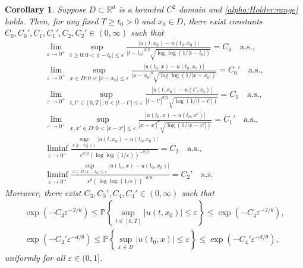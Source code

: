 \documentclass[reqno]{amsart}
\newcommand{\R}{\mathbb R}
\renewcommand{\P}{\mathbb P}
\newcommand{\1}{\mathbf 1}
\numberwithin{equation}{section}
\newtheorem{corollary}[theorem]{Corollary}
\theoremstyle{definition}
\begin{document}
\begin{corollary}
Suppose $D\subset \R^d$ is a bounded $C^2$ domain and \eqref{alpha:Holder:range} holds.
Then, for any fixed $T \ge t_0>0$ and $x_0 \in D$, there exist constants $C_0,C_0',C_1,C_1',C_2,C_2' \in (0,\infty)$ such that
\begin{gather*}
	\lim_{\varepsilon\to0^+} \sup_{t \ge 0:0< |t-t_0| \le \varepsilon} \frac{|u(t,x_0)-u(t_0,x_0)|}{|t-t_0|^{\theta/2} \sqrt{\log\log(1/|t-t_0|)}} = C_0 \quad \text{a.s.},\\
	\lim_{\varepsilon\to0^+} \sup_{x \in D: 0< |x-x_0| \le \varepsilon} \frac{|u(t_0,x)-u(t_0,x_0)|}{|x-x_0|^\theta \sqrt{\log\log(1/|x-x_0|)}} = C_0' \quad \text{a.s.},\\
	\lim_{\varepsilon\to0^+} \sup_{t,t' \in [0,T]: 0<|t-t'| \le \varepsilon} \frac{|u(t,x_0)-u(t',x_0)|}{|t-t'|^{\theta/2} \sqrt{\log(1/|t-t'|)}} = C_1 \quad \text{a.s.},\\
	\lim_{\varepsilon\to0^+} \sup_{x,x'\in D: 0<|x-x'| \le \varepsilon} \frac{|u(t_0,x)-u(t_0,x')|}{|x-x'|^\theta \sqrt{\log(1/|x-x'|)}} = C_1' \quad \text{a.s.},\\
	\liminf_{\varepsilon\to0^+} \frac{\sup_{t: |t-t_0| \le \varepsilon}|u(t,x_0)-u(t_0,x_0)|}{\varepsilon^{\theta/2} (\log\log(1/\varepsilon))^{-\theta/2}} = C_2 \quad \text{a.s.},\\
	\liminf_{\varepsilon\to0^+} \frac{\sup_{x \in D: |x-x_0| \le \varepsilon}|u(t_0,x)-u(t_0,x_0)|}{\varepsilon^\theta (\log\log(1/\varepsilon))^{-\theta/d}} = C_2' \quad \text{a.s.}
\end{gather*}
Moreover, there exist $C_3,C_3',C_4,C_4' \in (0,\infty)$ such that
\begin{gather*}
	\exp(-C_3 \varepsilon^{-2/\theta}) \le \P\left\{ \sup_{t \in [0,T]} |u(t,x_0)| \le \varepsilon \right\} \le \exp(-C_4 \varepsilon^{-2/\theta}),\\
	\exp(-C_3' \varepsilon^{-d/\theta}) \le \P\left\{ \sup_{x \in D} |u(t_0,x)| \le \varepsilon \right\} \le \exp(-C_4' \varepsilon^{-d/\theta}),
\end{gather*}
uniformly for all $\varepsilon \in (0,1]$.
\end{corollary}

\end{document}
